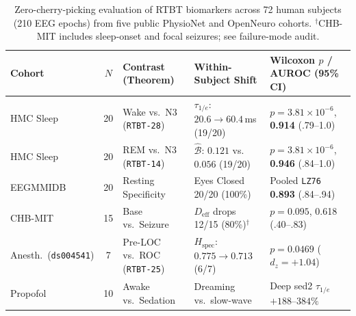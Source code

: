 \documentclass[11pt,letterpaper]{article}
\newcommand{\code}[1]{\texttt{\small #1}}
\begin{document}
\begin{table}[t]
\centering
\scriptsize
\renewcommand{\code}[1]{\texttt{#1}}
\setlength{\tabcolsep}{2.6pt}
\renewcommand{\arraystretch}{1.12}
\begin{tabular}{@{}l c l l l@{}}
\toprule
\textbf{Cohort} & \textbf{$N$} & \textbf{Contrast (Theorem)} & \textbf{Within-Subject Shift} & \textbf{Wilcoxon $p$ / AUROC (95\% CI)} \\
\midrule
HMC Sleep~\cite{HMC2021} & 20 & Wake vs.\ N3 (\code{RTBT-28}) & $\tau_{1/e}$: $20.6 \to 60.4\,$ms (19/20) & $p=3.81{\times}10^{-6}$, \textbf{0.914} (.79--1.0) \\
HMC Sleep~\cite{HMC2021} & 20 & REM vs.\ N3 (\code{RTBT-14}) & $\widehat{\mathcal{B}}$: $0.121$ vs.\ $0.056$ (19/20) & $p=3.81{\times}10^{-6}$, \textbf{0.946} (.84--1.0) \\
EEGMMIDB~\cite{EEGMMIDB2004} & 20 & Resting Specificity & Eyes Closed 20/20 (100\%) & Pooled \code{LZ76} \textbf{0.893} (.84--.94) \\
CHB-MIT~\cite{CHBMIT2009} & 15 & Base vs.\ Seizure & $D_{\mathrm{eff}}$ drops 12/15 (80\%)$^\dagger$ & $p=0.095$, 0.618 (.40--.83) \\
Anesth.\ (\code{ds004541}) & 7 & Pre-LOC vs.\ ROC (\code{RTBT-25}) & $H_{\mathrm{spec}}$: $0.775 \to 0.713$ (6/7) & $p=\mathbf{0.0469}$ ($d_z=+1.04$) \\
Propofol~\cite{Bajwa2024} & 10 & Awake vs.\ Sedation & Dreaming vs.\ slow-wave & Deep sed2 $\tau_{1/e}$ $+188$--$384\%$ \\
\bottomrule
\end{tabular}
\caption{Zero-cherry-picking evaluation of RTBT biomarkers across 72 human subjects (210 EEG epochs) from five public PhysioNet and OpenNeuro cohorts. $^\dagger$CHB-MIT includes sleep-onset and focal seizures; see failure-mode audit.}
\label{tab:eeg}
\end{table}
\end{document}
